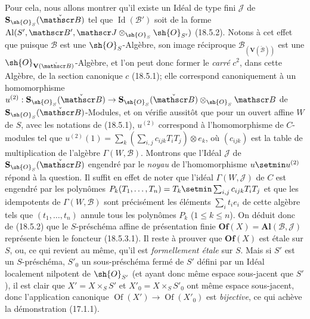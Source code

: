 Pour cela, nous allons montrer qu'il existe un Idéal de type fini $\mathscr J$ de $\mathbf S_{\sh{O}_S}(\check{\mathscr B})$ tel que $\operatorname{Id}(\mathscr B')$ soit de la forme $\operatorname{Al}(S',\mathscr B',\mathscr J\otimes_{\sh{O}_S}\sh{O}_{S'})$ (18.5.2). Notons à cet effet que puisque $\mathscr B$ est une $\sh{O}_S$-Algèbre, son image réciproque $\mathscr B_{(\mathbf V(\check{\mathscr B}))}$ est une $\sh{O}_{\mathbf V(\check{\mathscr B})}$-Algèbre, et l'on peut donc former le \emph{carré} $c^2$, dans cette Algèbre, de la section canonique $c$ (18.5.1); elle correspond canoniquement à un homomorphisme $u^{(2)}:\mathbf S_{\sh{O}_S}(\check{\mathscr B})\to\mathbf S_{\sh{O}_S}(\check{\mathscr B})\otimes_{\sh{O}_S}\mathscr B$ de $\mathbf S_{\sh{O}_S}(\check{\mathscr B})$-Modules, et on vérifie aussitôt que pour un ouvert affine $W$ de $S$, avec les notations de (18.5.1), $u^{(2)}$ correspond à l'homomorphisme de $C$-modules tel que $u^{(2)}(1)=\sum_k(\sum_{i,j}c_{ijk}T_iT_j)\otimes e_k$, où $(c_{ijk})$ est la table de multiplication de l'algèbre $\Gamma(W,\mathscr B)$. Montrons que l'Idéal $\mathscr J$ de $\mathbf S_{\sh{O}_S}(\check{\mathscr B})$ engendré par le \emph{noyau} de l'homomorphisme $u\setmin u^{(2)}$ répond à la question. Il suffit en effet de noter que l'idéal $\Gamma(W,\mathscr J)$ de $C$ est engendré par les polynômes $P_k(T_1,\ldots,T_n)=T_k\setmin\sum_{i,j}c_{ijk}T_iT_j$ et que les idempotents de $\Gamma(W,\mathscr B)$ sont précisément les éléments $\sum_i t_i e_i$ de cette algèbre tels que $(t_1,\ldots,t_n)$ annule tous les polynômes $P_k$ ($1\leq k\leq n$). On déduit donc de (18.5.2) que le $S$-préschéma affine de présentation finie $\mathbf{Of}(X)=\mathbf{Al}(\mathscr B,\mathscr J)$ représente bien le foncteur (18.5.3.1). Il reste à prouver que $\mathbf{Of}(X)$ est étale sur $S$, ou, ce qui revient au même, qu'il est \emph{formellement étale} sur $S$. Mais si $S'$ est un $S$-préschéma, $S'_0$ un sous-préschéma fermé de $S'$ défini par un Idéal localement nilpotent de $\sh{O}_{S'}$ (et ayant donc même espace sous-jacent que $S'$), il est clair que $X'=X\times_S S'$ et $X'_0=X\times_S S'_0$ ont même espace sous-jacent, donc l'application canonique $\operatorname{Of}(X')\to\operatorname{Of}(X'_0)$ est \emph{bijective}, ce qui achève la démonstration (17.1.1).

